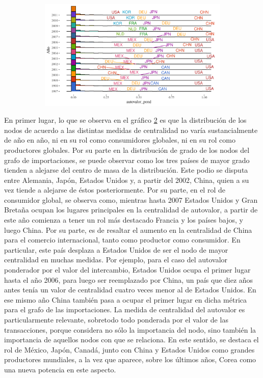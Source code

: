 \documentclass[runningheads,a4paper]{llncs}
\begin{document}
\begin{figure}
    \begin{subfigure}{.5\linewidth}
        \centering
        \label{fig:corr-c}%
        \caption{}
        \includegraphics[width=\linewidth]{impo_densidad_autovalor_pond_x_yr}%
    \end{subfigure}

\caption[]{}%
\label{fig:distribuciones}%
\end{figure}

En primer lugar, lo que se observa en el gráfico \ref{fig:distribuciones} es que la distribución de los nodos de acuerdo a las distintas medidas de centralidad no varía sustancialmente de año en año, ni en su rol como consumidores globales, ni en su rol como productores globales. Por su parte en la distribución de grado de los nodos del grafo de importaciones, se puede observar como los tres países de mayor grado tienden a alejarse del centro de masa de la distribución.  Este podio se disputa entre Alemania, Japón, Estados Unidos y, a partir del 2002, China, quien a su vez tiende a alejarse de éstos posteriormente. Por su parte, en el rol de consumidor global, se observa como, mientras hasta 2007 Estados Unidos y Gran Bretaña ocupan los lugares principales en la centralidad de autovalor, a partir de este año comienza a tener un rol más destacado Francia y los países bajos, y luego China. 
Por su parte, es de resaltar el aumento en la centralidad de China para el comercio internacional, tanto como productor como consumidor. En particular, este país desplaza a Estados Unidos de ser el nodo de mayor centralidad en muchas medidas. Por ejemplo, para el caso del autovalor ponderador por el valor del intercambio, Estados Unidos ocupa el primer lugar hasta el año 2006, para luego ser reemplazado por China, un país que diez años antes tenía un valor de centralidad cuatro veces menor al de Estados Unidos. En ese mismo año China también pasa a ocupar el primer lugar en dicha métrica para el grafo de las importaciones. La medida de centralidad del autovalor es particularmente relevante, sobretodo todo ponderada por el valor de las transacciones, porque considera no sólo la importancia del nodo, sino también la importancia de aquellos nodos con que se relaciona. En este sentido, se destaca el rol de México, Japón, Canadá, junto con China y Estados Unidos como grandes productores mundiales, a la vez que aparece, sobre los últimos años, Corea como una nueva potencia en este aspecto.  
\end{document}

